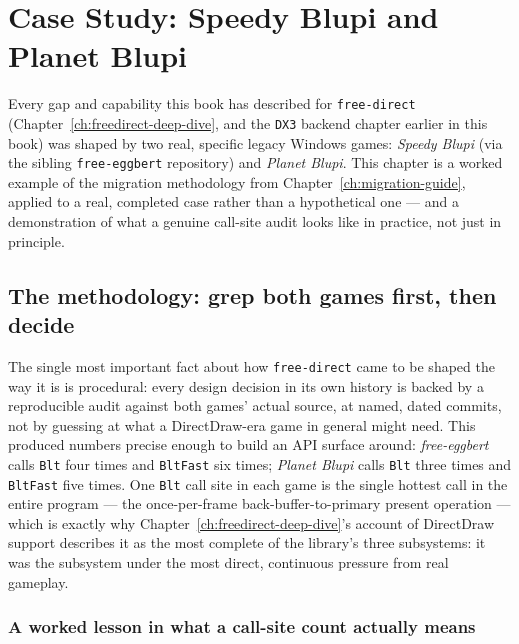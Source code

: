 \chapter{Case Study: Speedy Blupi and Planet Blupi}
\label{ch:blupi-case-study}

Every gap and capability this book has described for \texttt{free-direct}
(Chapter~\ref{ch:freedirect-deep-dive}, and the \texttt{DX3} backend chapter earlier in this book) was
shaped by two real, specific legacy Windows games: \emph{Speedy Blupi} (via the sibling
\texttt{free-eggbert} repository) and \emph{Planet Blupi}. This chapter is a worked example of
the migration methodology from Chapter~\ref{ch:migration-guide}, applied to a real, completed
case rather than a hypothetical one --- and a demonstration of what a genuine call-site audit
looks like in practice, not just in principle.

\section{The methodology: grep both games first, then decide}

The single most important fact about how \texttt{free-direct} came to be shaped the way it is
is procedural: every design decision in its own history is backed by a reproducible audit
against both games' actual source, at named, dated commits, not by guessing at what a
DirectDraw-era game in general might need. This produced numbers precise enough to build an
API surface around: \emph{free-eggbert} calls \texttt{Blt} four times and \texttt{BltFast} six
times; \emph{Planet Blupi} calls \texttt{Blt} three times and \texttt{BltFast} five times. One
\texttt{Blt} call site in each game is the single hottest call in the entire program --- the
once-per-frame back-buffer-to-primary present operation --- which is exactly why
Chapter~\ref{ch:freedirect-deep-dive}'s account of DirectDraw support describes it as the most
complete of the library's three subsystems: it was the subsystem under the most direct,
continuous pressure from real gameplay.

\subsection{A worked lesson in what a call-site count actually means}

